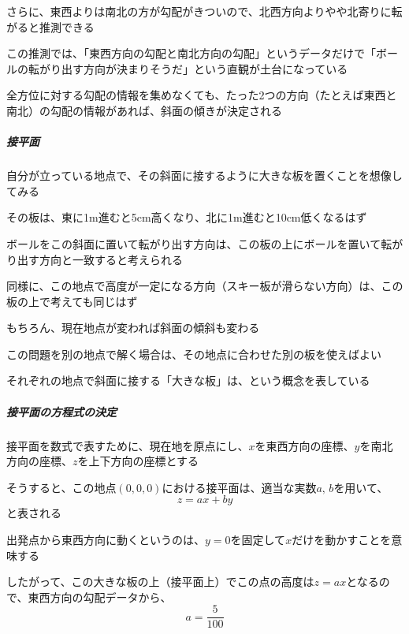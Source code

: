 \documentclass[../book_jiriki_calc]{subfiles}
\begin{document}
さらに、東西よりは南北の方が勾配がきついので、北西方向よりやや北寄りに転がると推測できる

\sectionline

この推測では、「東西方向の勾配と南北方向の勾配」というデータだけで「ボールの転がり出す方向が決まりそうだ」という直観が土台になっている

\br

全方位に対する勾配の情報を集めなくても、たった2つの方向（たとえば東西と南北）の勾配の情報があれば、斜面の傾きが決定される

\sectionline

\subparagraph{接平面}

自分が立っている地点で、その斜面に接するように大きな板を置くことを想像してみる

その板は、東に1m進むと5cm高くなり、北に1m進むと10cm低くなるはず

\br

ボールをこの斜面に置いて転がり出す方向は、この板の上にボールを置いて転がり出す方向と一致すると考えられる

同様に、この地点で高度が一定になる方向（スキー板が滑らない方向）は、この板の上で考えても同じはず

\br

もちろん、現在地点が変われば斜面の傾斜も変わる

この問題を別の地点で解く場合は、その地点に合わせた別の板を使えばよい

\br

それぞれの地点で斜面に接する「大きな板」は、という概念を表している

\sectionline

\subparagraph{接平面の方程式の決定}

接平面を数式で表すために、現在地を原点にし、$x$を東西方向の座標、$y$を南北方向の座標、$z$を上下方向の座標とする

そうすると、この地点$(0,0,0)$における接平面は、適当な実数$a,\, b$を用いて、
\begin{equation*}
  z = ax + by
\end{equation*}
と表される

\br

出発点から東西方向に動くというのは、$y=0$を固定して$x$だけを動かすことを意味する

したがって、この大きな板の上（接平面上）でこの点の高度は$z=ax$となるので、東西方向の勾配データから、
\begin{equation*}
  a = \dfrac{5}{100}
\end{equation*}
\end{document}
